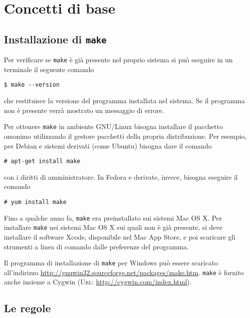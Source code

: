 \cleardoublepage{}
\chapter{Concetti di base}
\label{cha:concetti-base}

\section{Installazione di \texttt{make}}
\label{sec:installazione}

Per verificare se \texttt{make} è già presente nel proprio sistema si può
eseguire in un terminale il seguente comando
\begin{verbatim}
$ make --version
\end{verbatim}
che restituisce la versione del programma installata nel sistema.  Se il
programma non è presente verrà mostrato un messaggio di errore.

Per ottenere \texttt{make} in ambiente GNU/Linux bisogna installare il pacchetto
omonimo utilizzando il gestore pacchetti della propria distribuzione.  Per
esempio, per Debian e sistemi derivati (come Ubuntu) bisogna dare il comando
\begin{verbatim}
# apt-get install make
\end{verbatim}
con i diritti di amministratore.  In Fedora e derivate, invece, bisogna eseguire
il comando
\begin{verbatim}
# yum install make
\end{verbatim}

Fino a qualche anno fa, \texttt{make} era preinstallato sui sistemi Mac OS X.
Per installare \texttt{make} nei sistemi Mac OS X sui quali non è già presente,
si deve installare il software Xcode, disponibile nel Mac App Store, e poi
scaricare gli strumenti a linea di comando dalle preferenze del programma.

Il programma di installazione di \texttt{make} per Windows può essere scaricato
all'indirizzo \url{http://gnuwin32.sourceforge.net/packages/make.htm}.
\texttt{make} è fornito anche insieme a Cygwin (\textsc{Url}:
\url{http://cygwin.com/index.html}).

\section{Le regole}
\label{sec:le-regole}

